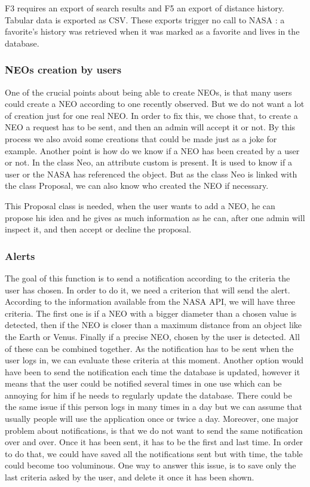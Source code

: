 F3 requires an export of search results and F5 an export of distance
history. Tabular data is exported as CSV. These exports trigger no call to
NASA : a favorite's history was retrieved when it was marked as a favorite
and lives in the database.

\subsubsection{NEOs creation by users}

One of the crucial points about being able to create NEOs, is that many users could create a NEO according to one recently observed. But we do not want a lot of creation just for one real NEO. In order to fix this, we chose that, to create a NEO a request has to be sent, and then an admin will accept it or not. By this process we also avoid some creations that could be made just as a joke for example.
Another point is how do we know if a NEO has been created by a user or not. In the class Neo, an attribute custom is present. It is used to know if a user or the NASA has referenced the object. But as the class Neo is linked with the class Proposal, we can also know who created the NEO if necessary.

This Proposal class is needed, when the user wants to add a NEO, he can propose his idea and he gives as much information as he can, after one admin will inspect it, and then accept or decline the proposal.

\subsubsection{Alerts}

The goal of this function is to send a notification according to the criteria the user has chosen. In order to do it, we need a criterion that will send the alert. According to the information available from the NASA API, we will have three criteria. The first one is if a NEO with a bigger diameter than a chosen value is detected, then if the NEO is closer than a maximum distance from an object like the Earth or Venus. Finally if a precise NEO, chosen by the user is detected. All of these can be combined together.
As the notification has to be sent when the user logs in, we can evaluate these criteria at this moment. Another option would have been to send the notification each time the database is updated, however it means that the user could be notified several times in one use which can be annoying for him if he needs to regularly update the database. There could be the same issue if this person logs in many times in a day but we can assume that usually people will use the application once or twice a day.
Moreover, one major problem about notifications, is that we do not want to send the same notification over and over. Once it has been sent, it has to be the first and last time. In order to do that, we could have saved all the notifications sent but with time, the table could become too voluminous. One way to answer this issue, is to save only the last criteria asked by the user, and delete it once it has been shown.

